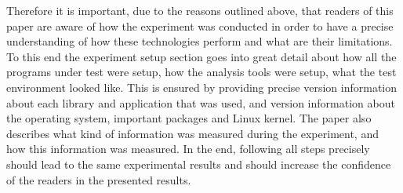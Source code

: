 Therefore it is important, due to the reasons outlined above, that readers of this paper are aware of how the experiment was conducted in order to have a precise understanding of how these technologies perform and what are their limitations.
To this end the experiment setup section goes into great detail about how all the programs under test were setup, how the analysis tools were setup, what the test environment looked like.
This is ensured by providing precise version information about each library and application that was used, and version information about the operating system, important packages and Linux kernel.
The paper also describes what kind of information was measured during the experiment, and how this information was measured.
In the end, following all steps precisely should lead to the same experimental results and should increase the confidence of the readers in the presented results.
